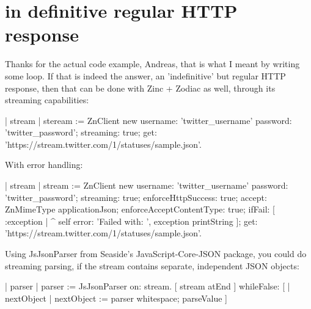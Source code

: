 \documentclass[a4paper,10pt,twoside]{book}
\begin{document}
\section{in definitive regular HTTP response}
Thanks for the actual code example, Andreas, that is what I meant by writing some loop. If that is indeed the answer, an 'indefinitive' but regular HTTP response, then that can be done with Zinc + Zodiac as well, through its streaming capabilities: 

\begin{code}
| stream |
steream := ZnClient new
	username: 'twitter_username' password: 'twitter_password';
	streaming: true;
	get: 'https://stream.twitter.com/1/statuses/sample.json'.
\end{code}

With error handling:

\begin{code}
| stream |
stream := ZnClient new
	username: 'twitter_username' password: 'twitter_password';
	streaming: true;
	enforceHttpSuccess: true; 
	accept: ZnMimeType applicationJson;
	enforceAcceptContentType: true; 
	ifFail: [ :exception | ^ self error: 'Failed with: ', exception printString ]; 
	get: 'https://stream.twitter.com/1/statuses/sample.json'.
\end{code}

Using JsJsonParser from Seaside's JavaScript-Core-JSON package, you could do streaming parsing, if the stream contains separate, independent JSON objects:

\begin{code}
| parser |
parser := JsJsonParser on: stream.
[ stream atEnd ] whileFalse: [ | nextObject |
	nextObject := parser whitespace; parseValue ]
\end{code}






\ifx\wholebook\relax\else
\end{document}
